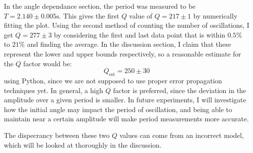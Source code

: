 \documentclass[%
 reprint,
 amsmath,amssymb
 aps,
]{revtex4-2}
\begin{document}
In the angle dependance section, the period was measured to be  $T=2.140 \pm 0.005 \si{\second}$. This gives the first $Q$ value of $Q=217\pm 1$ by numerically fitting the plot. Using the second method of counting the number of oscillations, I get $Q=277 \pm 3$ by considering the first and last data point that is within $0.5\%$ to $21\%$ and finding the average. In the discussion section, I claim that these represent the lower and upper bounds respectively, so a reasonable estimate for the $Q$ factor would be:
\begin{equation}
    Q_\text{est} = 250 \pm 30
    \label{eq:}
\end{equation}
using Python, since we are not supposed to use proper error propagation techniques yet. In general, a high $Q$ factor is preferred, since the deviation in the amplitude over a given period is smaller. In future experiments, I will investigate how the initial angle may impact the period of oscillation, and being able to maintain near a certain amplitude will make period measurements more accurate.

The dispecrancy between these two $Q$ values can come from an incorrect model, which will be looked at thoroughly in the discussion.
\end{document}
